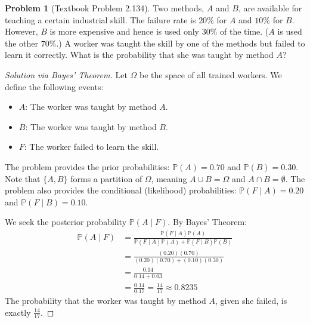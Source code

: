 \documentclass[11pt, letterpaper]{article}
\theoremstyle{definition}
\newtheorem{problem}{Problem}
\renewcommand{\P}{\mathbb{P}}
\begin{document}
\begin{problem}[Textbook Problem 2.134]
Two methods, $A$ and $B$, are available for teaching a certain industrial skill. The failure rate is $20\%$ for $A$ and $10\%$ for $B$. However, $B$ is more expensive and hence is used only $30\%$ of the time. ($A$ is used the other $70\%$.) A worker was taught the skill by one of the methods but failed to learn it correctly. What is the probability that she was taught by method $A$?
\end{problem}
\begin{proof}[Solution via Bayes' Theorem]
Let $\Omega$ be the space of all trained workers. We define the following events:
\begin{itemize}
    \item $A$: The worker was taught by method $A$.
    \item $B$: The worker was taught by method $B$.
    \item $F$: The worker failed to learn the skill.
\end{itemize}
The problem provides the prior probabilities: $\P(A) = 0.70$ and $\P(B) = 0.30$. Note that $\{A, B\}$ forms a partition of $\Omega$, meaning $A \cup B = \Omega$ and $A \cap B = \emptyset$.
The problem also provides the conditional (likelihood) probabilities: $\P(F \mid A) = 0.20$ and $\P(F \mid B) = 0.10$.

We seek the posterior probability $\P(A \mid F)$. By Bayes' Theorem:
\begin{align*}
    \P(A \mid F) &= \frac{\P(F \mid A)\P(A)}{\P(F \mid A)\P(A) + \P(F \mid B)\P(B)} \\
    &= \frac{(0.20)(0.70)}{(0.20)(0.70) + (0.10)(0.30)} \\
    &= \frac{0.14}{0.14 + 0.03} \\
    &= \frac{0.14}{0.17} = \frac{14}{17} \approx 0.8235
\end{align*}
The probability that the worker was taught by method $A$, given she failed, is exactly $\frac{14}{17}$.
\end{proof}

\vspace{0.5cm}
\end{document}
